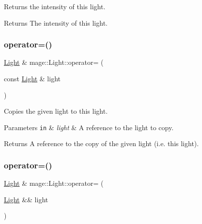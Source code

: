 Returns the intensity of this light.

\begin{DoxyReturn}{Returns}
The intensity of this light. 
\end{DoxyReturn}
\hypertarget{classmage_1_1_light_ad1267c8d162e2cdead5e3a7d83cef3c1}{}\label{classmage_1_1_light_ad1267c8d162e2cdead5e3a7d83cef3c1} 
\subsubsection{\texorpdfstring{operator=()}{operator=()}\hspace{0.1cm}{\footnotesize\ttfamily [1/2]}}
{\footnotesize\ttfamily \hyperlink{classmage_1_1_light}{Light} \& mage\+::\+Light\+::operator= (\begin{DoxyParamCaption}\item[{const \hyperlink{classmage_1_1_light}{Light} \&}]{light }\end{DoxyParamCaption})\hspace{0.3cm}{\ttfamily [default]}}

Copies the given light to this light.


\begin{DoxyParams}[1]{Parameters}
\mbox{\tt in}  & {\em light} & A reference to the light to copy. \\
\hline
\end{DoxyParams}
\begin{DoxyReturn}{Returns}
A reference to the copy of the given light (i.\+e. this light). 
\end{DoxyReturn}
\hypertarget{classmage_1_1_light_a5fd2edc3fcbcc1dbe7a2620b76cedd25}{}\label{classmage_1_1_light_a5fd2edc3fcbcc1dbe7a2620b76cedd25} 
\subsubsection{\texorpdfstring{operator=()}{operator=()}\hspace{0.1cm}{\footnotesize\ttfamily [2/2]}}
{\footnotesize\ttfamily \hyperlink{classmage_1_1_light}{Light} \& mage\+::\+Light\+::operator= (\begin{DoxyParamCaption}\item[{\hyperlink{classmage_1_1_light}{Light} \&\&}]{light }\end{DoxyParamCaption})\hspace{0.3cm}{\ttfamily [default]}}

